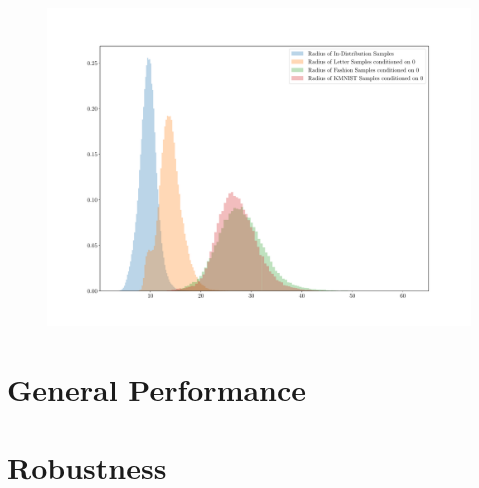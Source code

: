 \begin{figure}[htpb]
    \centering
    \includegraphics[width=0.8\linewidth]{figures/samples/emnist_radius_hist.pdf}
    \caption{}%
    \label{fig:}
\end{figure}


\section{General Performance}%
\label{sec:general_performance}


\section{Robustness}%
\label{sec:robustness}


